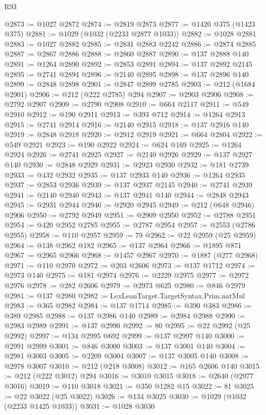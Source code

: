 \begin{lexlean}{R93}
\begin{coremodule}
@2873 := @1027 @2872
@2874 := @2819 @2873
@2877 := @1420 @375 (@1423 @375)
@2881 := @1029 (@1032 (@2233 @2877 @1033))
@2882 := @1028 @2881
@2883 := @1027 @2882
@2885 := @2831 @2883 @2242
@2886 := @2874 @2885
@2887 := @2867 @2886
@2888 := @2860 @2887
@2890 := @137 @2888 @140
@2891 := @1264 @2890
@2892 := @2853 @2891
@2894 := @137 @2892 @2145
@2895 := @2741 @2894
@2896 := @2140 @2895
@2898 := @137 @2896 @140
@2899 := @2848 @2898
@2901 := @2847 @2899 @2785
@2903 := @212 (@1684 @2901)
@2906 := @212 (@222 @2785) @294
@2907 := @2903 @2906
@2908 := @2792 @2907
@2909 := @2790 @2908
@2910 := @664 @2117
@2911 := @549 @2910
@2912 := @190 @2911
@2913 := @393 @712
@2914 := @1264 @2913
@2915 := @2741 @2914
@2916 := @2140 @2915
@2918 := @137 @2916 @140
@2919 := @2848 @2918
@2920 := @2912 @2919
@2921 := @664 @2804
@2922 := @549 @2921
@2923 := @190 @2922
@2924 := @624 @169
@2925 := @1264 @2924
@2926 := @2741 @2925
@2927 := @2140 @2926
@2929 := @137 @2927 @140
@2930 := @2848 @2929
@2931 := @2923 @2930
@2932 := @181 @2739
@2933 := @432 @2932
@2935 := @137 @2933 @140
@2936 := @1264 @2935
@2937 := @2853 @2936
@2939 := @137 @2937 @2145
@2940 := @2741 @2939
@2941 := @2140 @2940
@2943 := @137 @2941 @140
@2944 := @2848 @2943
@2945 := @2931 @2944
@2946 := @2920 @2945
@2949 := @212 (@648 @2946) @2906
@2950 := @2792 @2949
@2951 := @2909 @2950
@2952 := @2788 @2951
@2954 := @420 @2952 @2785
@2955 := @2787 @2954
@2957 := @2553 (@2786 @2955)
@2958 := @110 @2957
@2959 := 79
@2962 := @22 @2959 (@25 @2959)
@2964 := @138 @2962 @182
@2965 := @137 @2964
@2966 := @1895 @871
@2967 := @2965 @2966
@2968 := @1457 @2967
@2970 := @1887 (@277 @2968)
@2971 := @110 @2970
@2972 := @203 @2606
@2973 := @137 @1712
@2974 := @2973 @140
@2975 := @181 @2974
@2976 := @2229 @2975
@2977 := @2972 @2976
@2978 := @282 @2606
@2979 := @2973 @625
@2980 := @846 @2979
@2981 := @137 @2980
@2982 := LexLeanTarget.TargetSyntax.Prim.natMul
@2983 := @365 @2982
@2984 := @137 @1714
@2985 := @390 @383
@2986 := @389 @2985
@2988 := @137 @2986 @140
@2989 := @2984 @2988
@2990 := @2983 @2989
@2991 := @137 @2990
@2992 := 80
@2995 := @22 @2992 (@25 @2992)
@2997 := @134 @2995 @692
@2999 := @137 @2997 @140
@3000 := @2991 @2999
@3001 := @846 @3000
@3003 := @137 @3001 @140
@3004 := @2981 @3003
@3005 := @2209 @3004
@3007 := @137 @3005 @140
@3008 := @2978 @3007
@3010 := @212 (@218 @3008)
@3012 := @165 @2606 @140
@3015 := @212 (@222 @3012) @294
@3016 := @3010 @3015
@3018 := @2640 (@2977 @3016)
@3019 := @110 @3018
@3021 := @350 @1282 @15
@3022 := 81
@3025 := @22 @3022 (@25 @3022)
@3026 := @134 @3025
@3030 := @1029 (@1032 (@2233 @1425 @1033))
@3031 := @1028 @3030

\end{coremodule}
\end{lexlean}
